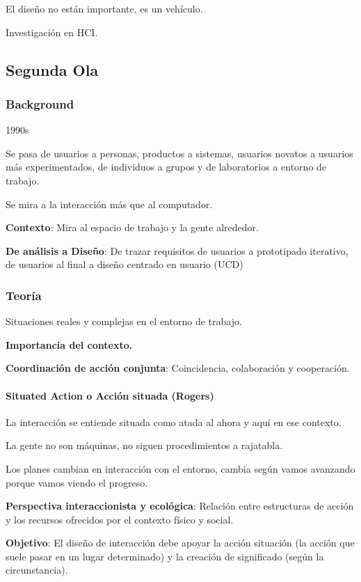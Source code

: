\documentclass[12pt, twoside, openright]{report} %
\begin{document}
El diseño no están importante, es un vehículo.

Investigación en HCI.

\subsection{Segunda Ola}

\subsubsection{Background}

1990s

Se pasa de usuarios a personas, productos a sistemas, usuarios novatos a
usuarios más experimentados, de individuos a grupos y de laboratorios a
entorno de trabajo.

Se mira a la interacción más que al computador.

\textbf{Contexto}: Mira al espacio de trabajo y la gente alrededor.

\textbf{De análisis a Diseño}: De trazar requisitos de usuarios a
prototipado iterativo, de usuarios al final a diseño centrado en usuario
(UCD)

\subsubsection{Teoría}

Situaciones reales y complejas en el entorno de trabajo.

\textbf{Importancia del contexto.}

\textbf{Coordinación de acción conjunta}: Coincidencia, colaboración y
cooperación.

\paragraph{Situated Action o Acción situada (Rogers)}

La interacción se entiende situada como atada al ahora y aquí en ese
contexto.

La gente no son máquinas, no siguen procedimientos a rajatabla.

Los planes cambian en interacción con el entorno, cambia según vamos
avanzando porque vamos viendo el progreso.

\textbf{Perspectiva interaccionista y ecológica}: Relación entre
estructuras de acción y los recursos ofrecidos por el contexto físico y
social.

\textbf{Objetivo}: El diseño de interacción debe apoyar la acción
situación (la acción que suele pasar en un lugar determinado) y la
creación de significado (según la circunstancia).
\end{document}
